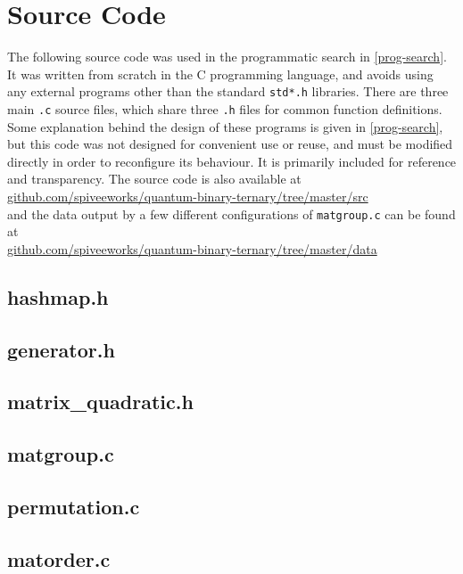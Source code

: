
\chapter[SOURCE CODE]{Source Code}

The following source code was used in the programmatic search in \autoref{prog-search}. It was written from scratch in the C programming language, and avoids using any external programs other than the standard \verb`std*.h` libraries. There are three main \verb`.c` source files, which share three \verb`.h` files for common function definitions. Some explanation behind the design of these programs is given in \autoref{prog-search}, but this code was not designed for convenient use or reuse, and must be modified directly in order to reconfigure its behaviour. It is primarily included for reference and transparency. The source code is also available at\\
\url{github.com/spiveeworks/quantum-binary-ternary/tree/master/src}
\\and the data output by a few different configurations of \verb`matgroup.c` can be found at \\
\url{github.com/spiveeworks/quantum-binary-ternary/tree/master/data}

\section{hashmap.h}
\lstset{language=c,breaklines=true,showstringspaces=false}

\clearpage
\section{generator.h}

\clearpage
\section{matrix{\_}quadratic.h}

\clearpage
\section{matgroup.c}

\clearpage
\section{permutation.c}

\clearpage
\section{matorder.c}
